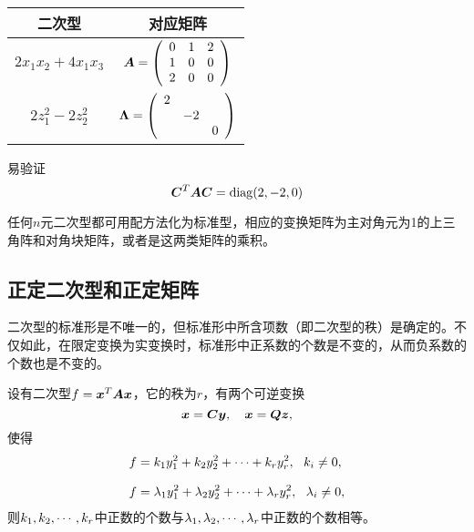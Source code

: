 \begin{frame}
  
    \begin{table}
      \caption{}
      \begin{tabular}{|c|c|}\hline
        二次型&对应矩阵\\\hline
        $2x_1x_2+4x_1x_3$ & $\boldsymbol{A}=\left(
        \begin{array}{ccc}
          0&1&2\\
          1&0&0\\
          2&0&0
        \end{array}
        \right)$\\\hline
        $2z_1^2-2z_2^2$ & $\boldsymbol{\Lambda}=\left(
        \begin{array}{ccc}
          2&&\\
          &-2&\\
          &&0
        \end{array}
        \right)$ \\\hline
      \end{tabular}      
    \end{table}
    易验证
    $$
    \boldsymbol{C}^T\boldsymbol{A}\boldsymbol{C}=\mathrm{diag}(2,-2,0)    
    $$
  
\end{frame}

\begin{frame}
  
    任何$n$元二次型都可用配方法化为标准型，相应的变换矩阵为主对角元为1的上三角阵和对角块矩阵，或者是这两类矩阵的乘积。
  
\end{frame}


\subsection{正定二次型和正定矩阵}

\begin{frame}
  二次型的标准形是不唯一的，但标准形中所含项数（即二次型的秩）是确定的。不仅如此，在限定变换为实变换时，标准形中正系数的个数是不变的，从而负系数的个数也是不变的。
\end{frame}

\begin{frame}
  \begin{dingli}[惯性定理]
    设有二次型$f={\boldsymbol{x}}^T\boldsymbol{A}{\boldsymbol{x}}$，它的秩为$r$，有两个可逆变换
    $$
    {\boldsymbol{x}} = \boldsymbol{C}{\boldsymbol{y}}, \quad {\boldsymbol{x}} = \boldsymbol{Q} {\boldsymbol{z}},
    $$
    使得
    $$
    \begin{aligned}
      f & = k_1y_1^2+k_2y_2^2+\cdots+k_ry_r^2, ~~ k_i\ne 0, \\[0.1in]
      f & = \lambda_1y_1^2+\lambda_2y_2^2+\cdots+\lambda_ry_r^2, ~~ \lambda_i\ne 0,
    \end{aligned}
    $$
    则$k_1,k_2,\cdots,k_r$中正数的个数与$\lambda_1,\lambda_2,\cdots,\lambda_r$中正数的个数相等。
  \end{dingli}
\end{frame}

